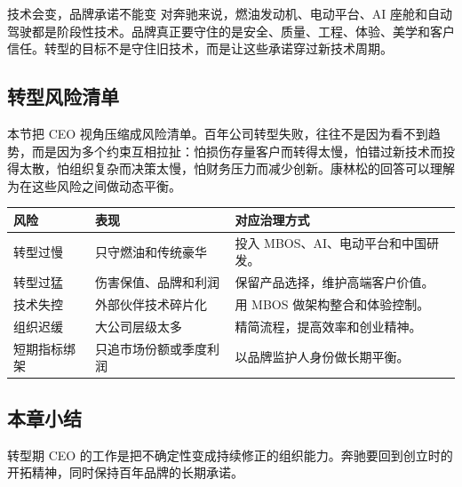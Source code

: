 \begin{importantbox}{技术会变，品牌承诺不能变}
对奔驰来说，燃油发动机、电动平台、AI 座舱和自动驾驶都是阶段性技术。品牌真正要守住的是安全、质量、工程、体验、美学和客户信任。转型的目标不是守住旧技术，而是让这些承诺穿过新技术周期。
\end{importantbox}

\subsection{转型风险清单}

本节把 CEO 视角压缩成风险清单。百年公司转型失败，往往不是因为看不到趋势，而是因为多个约束互相拉扯：怕损伤存量客户而转得太慢，怕错过新技术而投得太散，怕组织复杂而决策太慢，怕财务压力而减少创新。康林松的回答可以理解为在这些风险之间做动态平衡。

\noindent\begin{tabularx}{\textwidth}{p{}p{}X}
\toprule
风险 & 表现 & 对应治理方式 \\
\midrule
转型过慢 & 只守燃油和传统豪华 & 投入 MBOS、AI、电动平台和中国研发。 \\
转型过猛 & 伤害保值、品牌和利润 & 保留产品选择，维护高端客户价值。 \\
技术失控 & 外部伙伴技术碎片化 & 用 MBOS 做架构整合和体验控制。 \\
组织迟缓 & 大公司层级太多 & 精简流程，提高效率和创业精神。 \\
短期指标绑架 & 只追市场份额或季度利润 & 以品牌监护人身份做长期平衡。 \\
\bottomrule
\end{tabularx}

\subsection{本章小结}

转型期 CEO 的工作是把不确定性变成持续修正的组织能力。奔驰要回到创立时的开拓精神，同时保持百年品牌的长期承诺。

